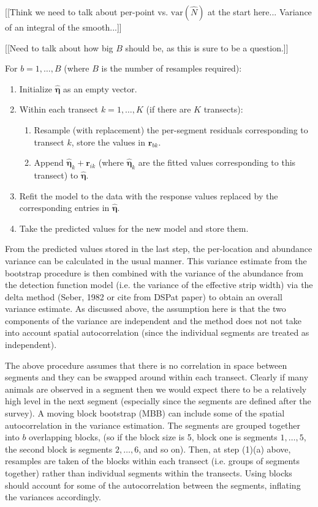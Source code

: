 \documentclass[useAMS,referee]{biom}
\begin{document}
[[Think we need to talk about per-point vs. $\text{var}(\hat{N})$ at the start here... Variance of an integral of the smooth...]]

[[Need to talk about how big $B$ should be, as this is sure to be a question.]]

For $b=1,\ldots,B$ (where $B$ is the number of resamples required):
\begin{enumerate}
	\item Initialize $\hat{\bm{\eta}}$ as an empty vector.
	\item Within each transect $k=1,\ldots,K$ (if there are $K$ transects):
	\begin{enumerate}
		\item Resample (with replacement) the per-segment residuals corresponding to transect $k$, store the values in $\mathbf{r}_{bk}$.
		\item Append $\hat{\bm{\eta}}_{k}+\mathbf{r}_{ik}$ (where $\hat{\bm{\eta}}_{k}$ are the fitted values corresponding to this transect) to $\hat{\bm{\eta}}$.
	\end{enumerate}
	\item Refit the model to the data with the response values replaced by the corresponding entries in $\hat{\bm{\eta}}$.
	\item Take the predicted values for the new model and store them.
\end{enumerate}
From the predicted values stored in the last step, the per-location and abundance variance can be calculated in the usual manner. This variance estimate from the bootstrap procedure is then combined with the variance of the abundance from the detection function model (i.e. the variance of the effective strip width) via the delta method (Seber, 1982 or cite from DSPat paper) to obtain an overall variance estimate. As discussed above, the assumption here is that the two components of the variance are independent and the method does not not take into account spatial autocorrelation (since the individual segments are treated as independent).

The above procedure assumes that there is no correlation in space between segments and they can be swapped around within each transect. Clearly if many animals are observed in a segment then we would expect there to be a relatively high level in the next segment (especially since the segments are defined after the survey). A moving block bootstrap (MBB) can include some of the spatial autocorrelation in the variance estimation. The segments are grouped together into $b$ overlapping blocks, (so if the block size is 5, block one is segments $1,\ldots,5$, the second block is segments $2,\ldots,6$, and so on). Then, at step (1)(a) above, resamples are taken of the blocks within each transect (i.e. groups of segments together) rather than individual segments within the transects. Using blocks should account for some of the autocorrelation between the segments, inflating the variances accordingly.
\end{document}
